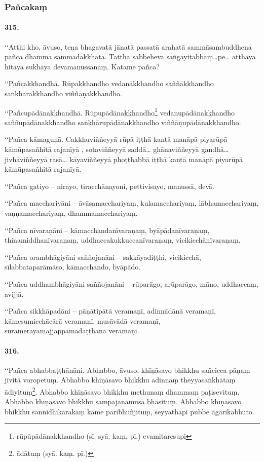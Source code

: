 
\subsubsection{Pañcakaṃ}

\paragraph{315.} ‘‘Atthi kho, āvuso, tena bhagavatā jānatā passatā arahatā sammāsambuddhena pañca dhammā sammadakkhātā. Tattha sabbeheva saṅgāyitabbaṃ…pe… atthāya hitāya sukhāya devamanussānaṃ. Katame pañca?

‘‘Pañcakkhandhā. Rūpakkhandho vedanākkhandho saññākkhandho saṅkhārakkhandho viññāṇakkhandho.

‘‘Pañcupādānakkhandhā. Rūpupādānakkhandho\footnote{rūpūpādānakkhandho (sī. syā. kaṃ. pī.) evamitaresupi} vedanupādānakkhandho saññupādānakkhandho saṅkhārupādānakkhandho viññāṇupādānakkhandho.

‘‘Pañca kāmaguṇā. Cakkhuviññeyyā rūpā iṭṭhā kantā manāpā piyarūpā kāmūpasañhitā rajanīyā , sotaviññeyyā saddā… ghānaviññeyyā gandhā… jivhāviññeyyā rasā… kāyaviññeyyā phoṭṭhabbā iṭṭhā kantā manāpā piyarūpā kāmūpasañhitā rajanīyā.

‘‘Pañca gatiyo – nirayo, tiracchānayoni, pettivisayo, manussā, devā.

‘‘Pañca macchariyāni – āvāsamacchariyaṃ, kulamacchariyaṃ, lābhamacchariyaṃ, vaṇṇamacchariyaṃ, dhammamacchariyaṃ.

‘‘Pañca nīvaraṇāni – kāmacchandanīvaraṇaṃ, byāpādanīvaraṇaṃ, thinamiddhanīvaraṇaṃ, uddhaccakukkuccanīvaraṇaṃ, vicikicchānīvaraṇaṃ.

‘‘Pañca orambhāgiyāni saññojanāni – sakkāyadiṭṭhi, vicikicchā, sīlabbataparāmāso, kāmacchando, byāpādo.

‘‘Pañca uddhambhāgiyāni saññojanāni – rūparāgo, arūparāgo, māno, uddhaccaṃ, avijjā.

‘‘Pañca sikkhāpadāni – pāṇātipātā veramaṇī, adinnādānā veramaṇī, kāmesumicchācārā veramaṇī, musāvādā veramaṇī, surāmerayamajjappamādaṭṭhānā veramaṇī.

\paragraph{316.} ‘‘Pañca abhabbaṭṭhānāni. Abhabbo, āvuso, khīṇāsavo bhikkhu sañcicca pāṇaṃ jīvitā voropetuṃ. Abhabbo khīṇāsavo bhikkhu adinnaṃ theyyasaṅkhātaṃ ādiyituṃ\footnote{ādātuṃ (syā. kaṃ. pī.)}. Abhabbo khīṇāsavo bhikkhu methunaṃ dhammaṃ paṭisevituṃ. Abhabbo khīṇāsavo bhikkhu sampajānamusā bhāsituṃ. Abhabbo khīṇāsavo bhikkhu sannidhikārakaṃ kāme paribhuñjituṃ, seyyathāpi pubbe āgārikabhūto.

